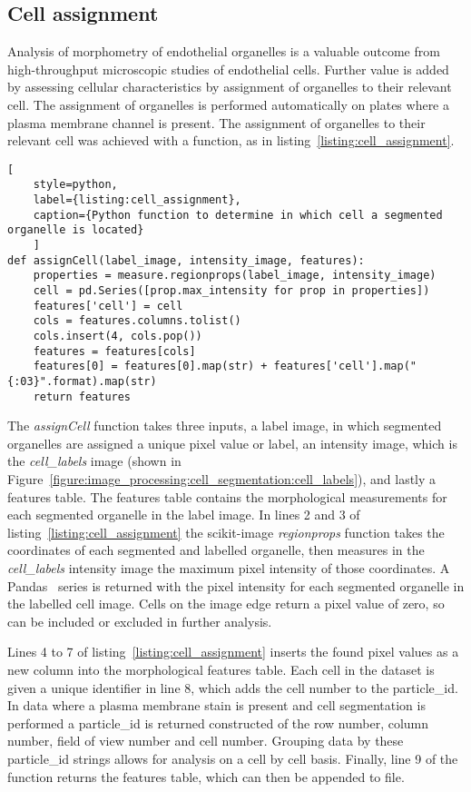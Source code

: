\subsection{Cell assignment}
\label{endothelial_morphometry:image_processing:cell_assignment}
Analysis of morphometry of endothelial organelles is a valuable outcome from high-throughput microscopic studies of endothelial cells. Further value is added by assessing cellular characteristics by assignment of organelles to their relevant cell. The assignment of organelles is performed automatically on plates where a plasma membrane channel is present. The assignment of organelles to their relevant cell was achieved with a function, as in listing~\ref{listing:cell_assignment}.

\begin{lstlisting}[
	style=python,
	label={listing:cell_assignment},
	caption={Python function to determine in which cell a segmented organelle is located}
	]
def assignCell(label_image, intensity_image, features):
    properties = measure.regionprops(label_image, intensity_image)
    cell = pd.Series([prop.max_intensity for prop in properties])
    features['cell'] = cell
    cols = features.columns.tolist()
    cols.insert(4, cols.pop())
    features = features[cols]
    features[0] = features[0].map(str) + features['cell'].map("{:03}".format).map(str)
    return features
\end{lstlisting}

The \emph{assignCell} function takes three inputs, a label image, in which segmented organelles are assigned a unique pixel value or label, an intensity image, which is the \emph{cell\_labels} image (shown in Figure~\ref{figure:image_processing:cell_segmentation:cell_labels}), and lastly a features table. The features table contains the morphological measurements for each segmented organelle in the label image. In lines 2 and 3 of listing~\ref{listing:cell_assignment} the scikit-image \emph{regionprops} function takes the coordinates of each segmented and labelled organelle, then measures in the \emph{cell\_labels} intensity image the maximum pixel intensity of those coordinates. A Pandas~\cite{McKinney2011} series is returned with the pixel intensity for each segmented organelle in the labelled cell image. Cells on the image edge return a pixel value of zero, so can be included or excluded in further analysis.

Lines 4 to 7 of listing~\ref{listing:cell_assignment} inserts the found pixel values as a new column into the morphological features table. Each cell in the dataset is given a unique identifier in line 8, which adds the cell number to the particle\_id. In data where a plasma membrane stain is present and cell segmentation is performed a particle\_id is returned constructed of the row number, column number, field of view number and cell number. Grouping data by these particle\_id strings allows for analysis on a cell by cell basis. Finally, line 9 of the function returns the features table, which can then be appended to file. 

